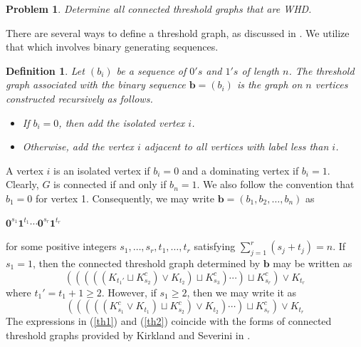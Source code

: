 \documentclass[preprint]{elsarticle}
\newtheorem{definition}[theorem]{Definition}
\newtheorem{problem}{Problem}
\begin{document}
\begin{problem}\label{problem A}
    Determine all connected threshold graphs that are WHD.
\end{problem}

There are several ways to define a threshold graph, as discussed in \cite{MP95}. We utilize that which involves binary generating sequences.
%
\begin{definition}
\label{def:threshold}
    Let $(b_{i})$ be a sequence of $0's$ and $1's$ of length $n$. The threshold graph associated with the binary sequence $\mathbf{b}=(b_{i})$ is the graph on $n$ vertices constructed recursively as follows.
    \begin{itemize}
        \item[(i)] If $b_{i} = 0$, then add the isolated vertex $i$.
        \item[(ii)] Otherwise, add the vertex $i$ adjacent to all vertices with label less than $i$.
    \end{itemize}
\end{definition}
A vertex $i$ is an isolated vertex if $b_i=0$ and a dominating vertex if $b_i = 1.$ Clearly, $G$ is connected if and only if $b_n = 1$. We also follow the convention that $b_1=0$ for vertex 1. Consequently, we may write $\mathbf{b}=(b_{1}, b_{2}, \ldots, b_{n})$ as
\begin{center}
$\mathbf{0}^{s_1}\mathbf{1}^{t_1}\cdots \mathbf{0}^{s_r}\mathbf{1}^{t_r}$ 
\end{center}
for some positive integers $s_1,\ldots,s_r,t_1,\ldots,t_r$ satisfying $\sum_{j=1}^r(s_j+t_j)=n$. If $s_1=1$, then the connected threshold graph determined by $\mathbf{b}$ may be written as
\begin{equation}
\label{th1}
(((((K_{t_1'}\sqcup K^c_{s_2})\vee K_{t_2})\sqcup K^c_{s_3})\cdots)\sqcup K^c_{s_r})\vee K_{t_{r}}%
\end{equation}
where $t_1'=t_1+1\geq 2$. However, if $s_1\geq 2$, then we may write it as
\begin{equation}
\label{th2}
(((((K_{s_1}^c\vee K_{t_1})\sqcup K_{s_2}^c)\vee K_{t_2})\cdots)\sqcup K_{s_r}^c)\vee K_{t_{r}}%
\end{equation}
The expressions in (\ref{th1}) and (\ref{th2}) coincide with the forms of connected threshold graphs provided by  Kirkland and Severini in \cite{kirkland2011spin}.
\end{document}

